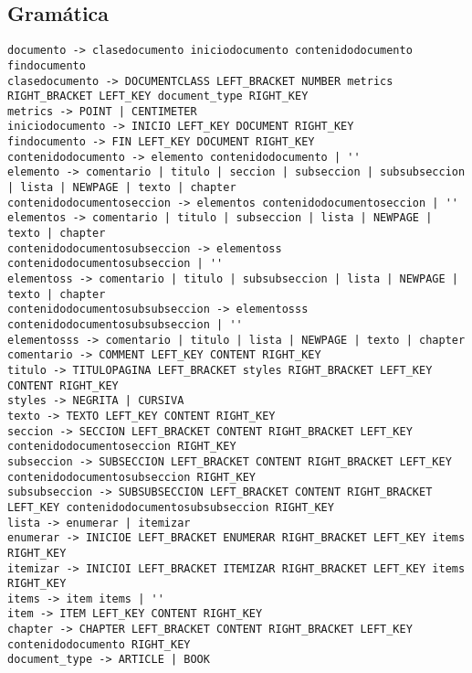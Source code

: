 \documentclass[12pt]{article}
\begin{document}
\begin{landscape}
\section{Gramática}
\begin{center}
        \begin{verbatim}
documento -> clasedocumento iniciodocumento contenidodocumento findocumento
clasedocumento -> DOCUMENTCLASS LEFT_BRACKET NUMBER metrics RIGHT_BRACKET LEFT_KEY document_type RIGHT_KEY
metrics -> POINT | CENTIMETER
iniciodocumento -> INICIO LEFT_KEY DOCUMENT RIGHT_KEY
findocumento -> FIN LEFT_KEY DOCUMENT RIGHT_KEY
contenidodocumento -> elemento contenidodocumento | ''
elemento -> comentario | titulo | seccion | subseccion | subsubseccion | lista | NEWPAGE | texto | chapter
contenidodocumentoseccion -> elementos contenidodocumentoseccion | ''
elementos -> comentario | titulo | subseccion | lista | NEWPAGE | texto | chapter
contenidodocumentosubseccion -> elementoss contenidodocumentosubseccion | ''
elementoss -> comentario | titulo | subsubseccion | lista | NEWPAGE | texto | chapter
contenidodocumentosubsubseccion -> elementosss contenidodocumentosubsubseccion | ''
elementosss -> comentario | titulo | lista | NEWPAGE | texto | chapter
comentario -> COMMENT LEFT_KEY CONTENT RIGHT_KEY
titulo -> TITULOPAGINA LEFT_BRACKET styles RIGHT_BRACKET LEFT_KEY CONTENT RIGHT_KEY
styles -> NEGRITA | CURSIVA
texto -> TEXTO LEFT_KEY CONTENT RIGHT_KEY
seccion -> SECCION LEFT_BRACKET CONTENT RIGHT_BRACKET LEFT_KEY contenidodocumentoseccion RIGHT_KEY
subseccion -> SUBSECCION LEFT_BRACKET CONTENT RIGHT_BRACKET LEFT_KEY contenidodocumentosubseccion RIGHT_KEY
subsubseccion -> SUBSUBSECCION LEFT_BRACKET CONTENT RIGHT_BRACKET LEFT_KEY contenidodocumentosubsubseccion RIGHT_KEY
lista -> enumerar | itemizar
enumerar -> INICIOE LEFT_BRACKET ENUMERAR RIGHT_BRACKET LEFT_KEY items RIGHT_KEY
itemizar -> INICIOI LEFT_BRACKET ITEMIZAR RIGHT_BRACKET LEFT_KEY items RIGHT_KEY
items -> item items | ''
item -> ITEM LEFT_KEY CONTENT RIGHT_KEY
chapter -> CHAPTER LEFT_BRACKET CONTENT RIGHT_BRACKET LEFT_KEY contenidodocumento RIGHT_KEY
document_type -> ARTICLE | BOOK


        \end{verbatim}
        \end{center}
        
\end{landscape}
\end{document}
